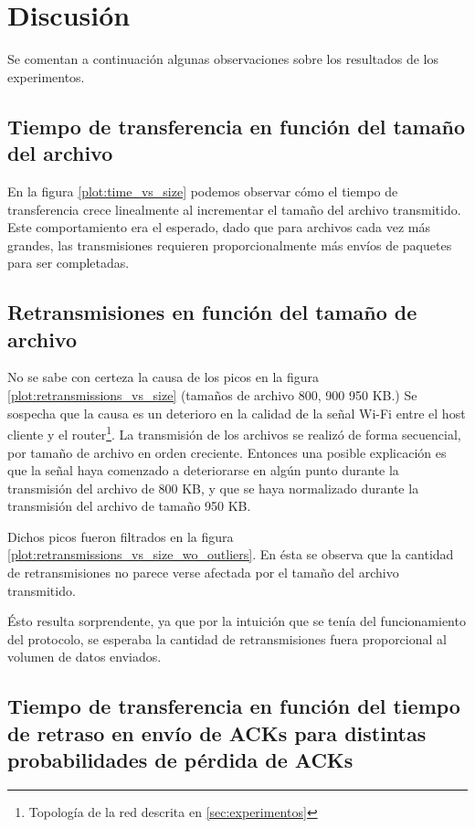 \documentclass[a4paper, 10pt, twoside]{article}
\begin{document}
\section{Discusión}
\label{sec:discusion}

Se comentan a continuación algunas observaciones sobre los resultados de los experimentos.


\subsection{Tiempo de transferencia en función del tamaño del archivo}

En la figura \ref{plot:time_vs_size} podemos observar cómo el tiempo de transferencia crece linealmente al incrementar el tamaño del archivo transmitido. Este comportamiento era el esperado, dado que para archivos cada vez más grandes, las transmisiones requieren proporcionalmente más envíos de paquetes para ser completadas.


\subsection{Retransmisiones en función del tamaño de archivo}
\label{sec:discusion-retransmisiones-vs-tam}

No se sabe con certeza la causa de los picos en la figura \ref{plot:retransmissions_vs_size} (tamaños de archivo 800, 900  950 KB.) Se sospecha que la causa es un deterioro en la calidad de la señal Wi-Fi entre el host cliente y el router\footnote{Topología de la red descrita en \ref{sec:experimentos}}. La transmisión de los archivos se realizó de forma secuencial, por tamaño de archivo en orden creciente. Entonces una posible explicación es que la señal haya comenzado a deteriorarse en algún punto durante la transmisión del archivo de 800 KB, y que se haya normalizado durante la transmisión del archivo de tamaño 950 KB.

Dichos picos fueron filtrados en la figura \ref{plot:retransmissions_vs_size_wo_outliers}. En ésta se observa que la cantidad de retransmisiones no parece verse afectada por el tamaño del archivo transmitido. 

Ésto resulta sorprendente, ya que por la intuición que se tenía del funcionamiento del protocolo, se esperaba la cantidad de retransmisiones fuera proporcional al volumen de datos enviados.


\subsection{Tiempo de transferencia en función del tiempo de retraso en envío de ACKs para distintas probabilidades de pérdida de ACKs}
\end{document}

